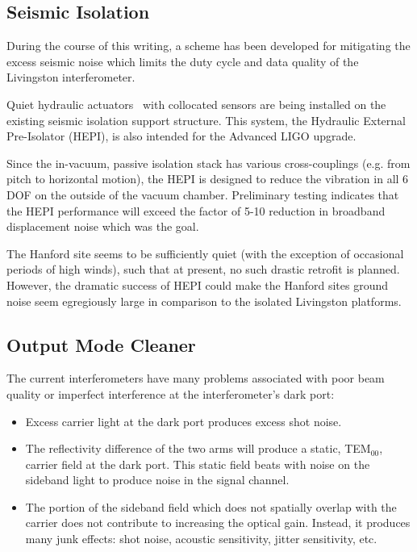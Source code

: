 \subsection{Seismic Isolation}
During the course of this writing, a scheme has been developed for mitigating the
excess seismic noise which limits the duty cycle and data quality of the Livingston
interferometer.

Quiet hydraulic actuators~\cite{Giaime:AdvIso} with collocated sensors are being 
installed on the existing seismic isolation support structure. This system,
the Hydraulic External Pre-Isolator (HEPI), is also intended for the Advanced LIGO upgrade.

Since the in-vacuum, passive isolation stack has various cross-couplings (e.g. from
pitch to horizontal motion), the HEPI is designed to reduce the vibration in all 6
DOF on the outside of the vacuum chamber. Preliminary testing indicates that the
HEPI performance will exceed the factor of 5-10 reduction in broadband displacement
noise which was the goal.

The Hanford site seems to be sufficiently quiet (with the exception of occasional
periods of high winds), such that at present, no such drastic retrofit is planned.
However, the dramatic success of HEPI could make the Hanford sites ground noise
seem egregiously large in comparison to the isolated Livingston platforms.


\subsection{Output Mode Cleaner}

The current interferometers have many problems associated with poor beam quality or
imperfect interference at the interferometer's dark port:

\begin{itemize}
\item Excess carrier light at the dark port produces excess shot noise.

\item The reflectivity difference of the two arms will produce a static, TEM$_{00}$,
      carrier field at the dark port. This static field beats with noise on the
      sideband light to produce noise in the signal channel.

\item The portion of the sideband field which does not spatially overlap with
      the carrier does not contribute to increasing the optical gain. Instead,
      it produces many junk effects: shot noise, acoustic sensitivity, jitter
      sensitivity, etc.
\end{itemize}

